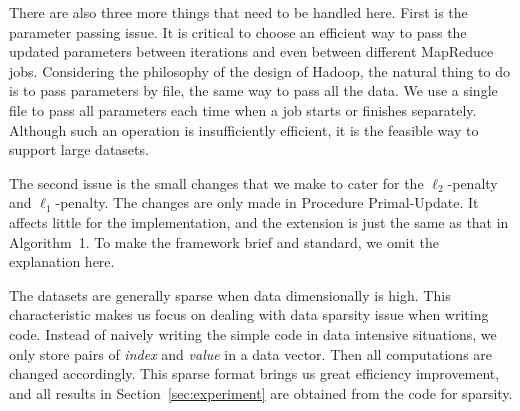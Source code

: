 \documentclass[10pt, conference, compsocconf]{IEEEtran}
\begin{document}
There are also three more things that need to be handled here.
First is the parameter passing issue. It is critical to choose an efficient way to pass the updated parameters between iterations and even between different MapReduce jobs. Considering the philosophy of the design of Hadoop, the natural thing to do is to pass parameters by file, the same way to pass all the data. We use a single file to pass all parameters each time when a job starts or finishes separately. Although such an operation is insufficiently efficient, it is the feasible way to support large datasets.

The second issue is the small changes that we make to cater for the $\ell_2$-penalty and $\ell_1$-penalty. The changes are only made in Procedure Primal-Update. It affects little for the implementation, and the extension is just the same as that in Algorithm~1. To make the framework brief and standard, we omit the explanation here.

The datasets are generally sparse when data dimensionally is high. This characteristic makes us focus on dealing with data sparsity issue when writing code. Instead of naively writing the simple code in data intensive situations, we only store pairs of \textit{index} and \textit{value} in a data vector. Then all computations are changed accordingly.
This sparse format brings us great efficiency improvement, and all results in Section~\ref{sec:experiment} are obtained from the code for sparsity.
\end{document}
